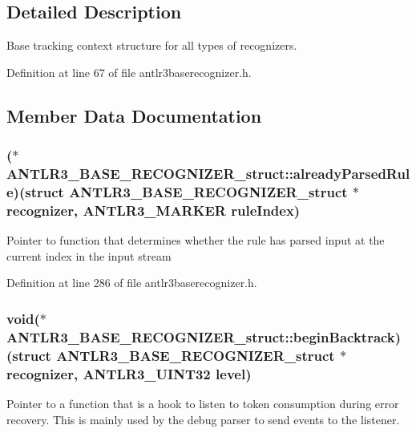 \subsection{Detailed Description}
Base tracking context structure for all types of recognizers. 

Definition at line 67 of file antlr3baserecognizer.\-h.



\subsection{Member Data Documentation}
\hypertarget{struct_a_n_t_l_r3___b_a_s_e___r_e_c_o_g_n_i_z_e_r__struct_a744bf4a5301c39c7b357d16589705609}{
\subsubsection[{already\-Parsed\-Rule}]{($\ast$ A\-N\-T\-L\-R3\-\_\-\-B\-A\-S\-E\-\_\-\-R\-E\-C\-O\-G\-N\-I\-Z\-E\-R\-\_\-struct\-::already\-Parsed\-Rule)(struct {\bf A\-N\-T\-L\-R3\-\_\-\-B\-A\-S\-E\-\_\-\-R\-E\-C\-O\-G\-N\-I\-Z\-E\-R\-\_\-struct} $\ast${\bf recognizer}, {\bf A\-N\-T\-L\-R3\-\_\-\-M\-A\-R\-K\-E\-R} rule\-Index)}}\label{struct_a_n_t_l_r3___b_a_s_e___r_e_c_o_g_n_i_z_e_r__struct_a744bf4a5301c39c7b357d16589705609}
Pointer to function that determines whether the rule has parsed input at the current index in the input stream 

Definition at line 286 of file antlr3baserecognizer.\-h.

\hypertarget{struct_a_n_t_l_r3___b_a_s_e___r_e_c_o_g_n_i_z_e_r__struct_a8824d8d6af86c2e6101faece32760894}{
\subsubsection[{begin\-Backtrack}]{\setlength{\rightskip}{0pt plus 5cm}void($\ast$ A\-N\-T\-L\-R3\-\_\-\-B\-A\-S\-E\-\_\-\-R\-E\-C\-O\-G\-N\-I\-Z\-E\-R\-\_\-struct\-::begin\-Backtrack)(struct {\bf A\-N\-T\-L\-R3\-\_\-\-B\-A\-S\-E\-\_\-\-R\-E\-C\-O\-G\-N\-I\-Z\-E\-R\-\_\-struct} $\ast${\bf recognizer}, {\bf A\-N\-T\-L\-R3\-\_\-\-U\-I\-N\-T32} {\bf level})}}\label{struct_a_n_t_l_r3___b_a_s_e___r_e_c_o_g_n_i_z_e_r__struct_a8824d8d6af86c2e6101faece32760894}
Pointer to a function that is a hook to listen to token consumption during error recovery. This is mainly used by the debug parser to send events to the listener. 

